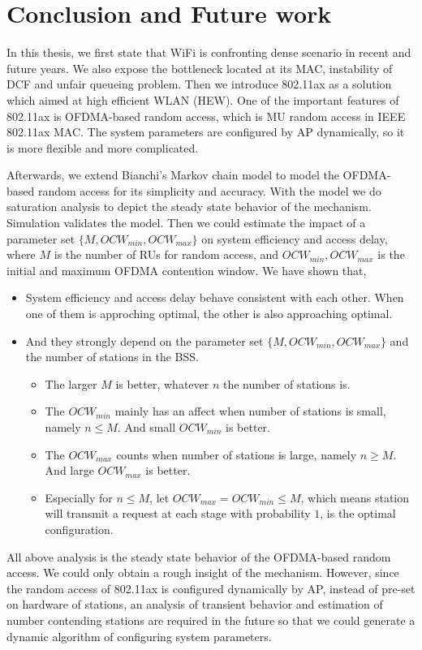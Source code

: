 \chapter{Conclusion and Future work}   \label{chp_conclu}
In this thesis, we first state that WiFi is confronting dense scenario in recent and future years.
We also expose the bottleneck located at its MAC, instability of DCF and unfair queueing problem. 
Then we introduce 802.11ax as a solution which aimed at high efficient WLAN (HEW).
One of the important features of 802.11ax is OFDMA-based random access, which is MU random access in IEEE 802.11ax MAC. 
The system parameters are configured by AP dynamically, so it is more flexible and more complicated. 

Afterwards, we extend Bianchi's Markov chain model to model the OFDMA-based random access for its simplicity and accuracy. 
With the model we do saturation analysis to depict the steady state behavior of the mechanism.
Simulation validates the model. 
Then we could estimate the impact of a parameter set $\lbrace M, OCW_{min}, OCW_{max} \rbrace$ on system efficiency and access delay, where $M$ is the number of RUs for random access,  and $OCW_{min}, OCW_{max}$ is the initial and maximum OFDMA contention window. 
We have shown that, 
\begin{itemize}
\item System efficiency and access delay behave consistent with each other. When one of them is approching optimal, the other is also approaching optimal.
\item And they strongly depend on the parameter set $\lbrace M, OCW_{min}, OCW_{max} \rbrace$ and the number of stations in the BSS. 
	\begin{itemize}
	\item The larger $M$ is better, whatever $n$ the number of stations is. 
	\item The $OCW_{min}$ mainly has an affect when number of stations is small, namely $n\leq 	M$. And small $OCW_{min}$ is better.
	\item The $OCW_{max}$ counts when number of stations is large, namely $n\geq M$. And large 	$OCW_{max}$ is better.
	\item Especially for $n \leq M$, let $OCW_{max}=OCW_{min}\leq M$, which means station will 	transmit a request at each stage with probability $1$, is the optimal configuration.
	\end{itemize}
\end{itemize}

All above analysis is the steady state behavior of the OFDMA-based random access. We could only obtain a rough insight of the mechanism.
However, since the random access of 802.11ax is configured dynamically by AP, instead of pre-set on hardware of stations, an analysis of transient behavior and estimation of number contending stations are required in the future so that we could generate a dynamic algorithm of configuring system parameters.

